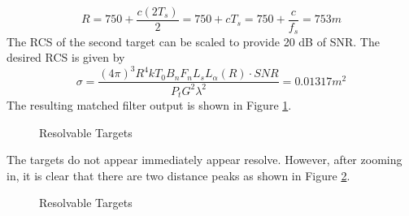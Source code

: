 \documentclass[12pt,letterpaper]{article}
\begin{document}
\begin{equation}
R = 750 + \frac{c(2T_s)}{2} = 750 + cT_s = 750 + \frac{c}{f_s} = 753 m
\end{equation}
The RCS of the second target can be scaled to provide 20 dB of SNR. The desired RCS is given by
\begin{equation}
\sigma = \frac{(4\pi)^3 R^4 k T_0 B_n F_n L_s L_\alpha(R)\cdot SNR}{P_t G^2 \lambda^2} = 0.01317  m^2
\end{equation}
The resulting matched filter output is shown in Figure \ref{Resolvable Full}.
\begin{figure}[H]
\caption{Resolvable Targets}
\label{Resolvable Full}
\end{figure}
The targets do not appear immediately appear resolve. However, after zooming in, it is clear that there are two distance peaks as shown in Figure \ref{Resolvable Peak}.
\begin{figure}[H]
\caption{Resolvable Targets}
\label{Resolvable Peak}
\end{figure}
\end{document}
